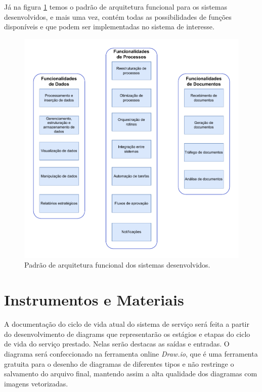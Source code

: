 	Já na figura \ref{fig:metodologia:arquiteturaFuncional} temos o padrão de arquitetura funcional para os sistemas desenvolvidos, e mais uma vez, contém todas as possibilidades
	de funções disponíveis e que podem ser implementadas no sistema de interesse.
	\begin{figure}[H]
		\centering
		\includegraphics[width=1\textwidth]{./figuras/arquiteturaFuncional.pdf}
		\caption{Padrão de arquitetura funcional dos sistemas desenvolvidos.}
		\label{fig:metodologia:arquiteturaFuncional}
	\end{figure}


	\section{Instrumentos e Materiais}

	A documentação do ciclo de vida atual do sistema de serviço será feita a partir do desenvolvimento de diagrams que representarão os estágios e etapas do ciclo de vida do serviço prestado. Nelas serão destacas as saídas e entradas. O diagrama será confeccionado na ferramenta online \textit{Draw.io}, 
	que é uma ferramenta gratuita para o desenho de diagramas de diferentes 
	tipos e não restringe o salvamento do arquivo final, mantendo 
	assim a alta qualidade dos diagramas com imagens vetorizadas. 
	
